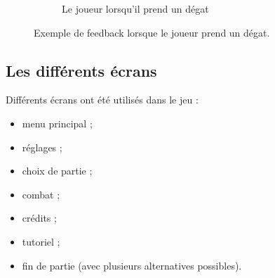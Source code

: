 \begin{figure}[ht]
\begin{subfigure}[t]{0.45\textwidth}
            \caption{Le joueur lorsqu'il prend un dégat}
        \end{subfigure}
        \caption{Exemple de feedback lorsque le joueur prend un dégat.}
        \label{fig:feedback}
    \end{figure}


\subsection{Les différents écrans}

Différents écrans ont été utilisés dans le jeu :
\begin{itemize}
    \item menu principal ;
    \item réglages ;
    \item choix de partie ;
    \item combat ;
    \item crédits ;
    \item tutoriel ;
    \item fin de partie (avec plusieurs alternatives possibles).
\end{itemize}
